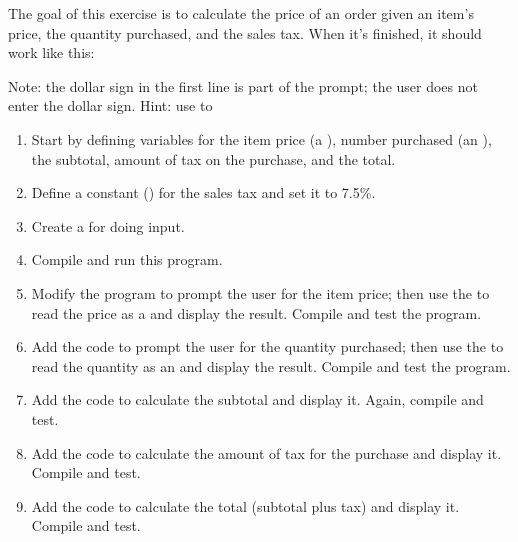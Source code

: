 \begin{exercise}  %
\label{purchase}

The goal of this exercise is to calculate the price of an order given an item's price, the quantity purchased, and the sales tax.
When it's finished, it should work like this:


Note: the dollar sign in the first line is part of the prompt; the user does not enter the dollar sign.
Hint: use  to 

\begin{enumerate}
\item Start by defining variables for the item price (a ), number purchased (an ), the subtotal, amount of tax on the purchase, and the total.

\item Define a constant () for the sales tax and set it to 7.5\%.

\item Create a  for doing input.

\item Compile and run this program.

\item Modify the program to prompt the user for the item price; then use the  to read the price as a  and display the result. Compile and test the program.

\item Add the code to prompt the user for the quantity purchased; then use the  to read the quantity as an  and display the result. Compile and test the program.

\item Add the code to calculate the subtotal and display it. Again, compile and test.

\item Add the code to calculate the amount of tax for the purchase and display it. Compile and test.

\item Add the code to calculate the total (subtotal plus tax) and display it. Compile and test.
\end{enumerate}

\end{exercise}

